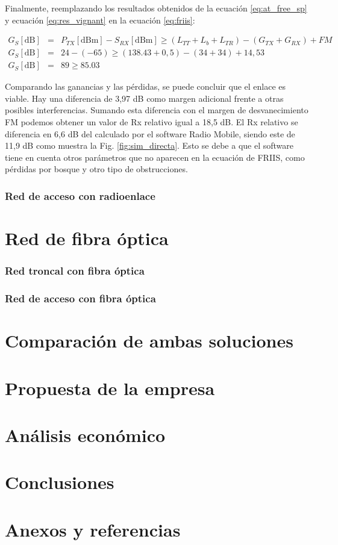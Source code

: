 \documentclass[11pt,a4paper]{article}
\begin{document}
Finalmente, reemplazando los resultados obtenidos de la ecuación \ref{eq:at_free_sp} y ecuación \ref{eq:res_vignant} en la ecuación \ref{eq:friis}: 

\begin{eqnarray*}
  G_S[\text{dB}]&=&P_{TX}[\text{dBm}]-S_{RX}[\text{dBm}] \geq (L_{TT}+L_b+L_{TR}) -(G_{TX}+G_{RX})+FM \\ 
G_S[\text{dB}]&=&24-(-65) \geq  (138.43+0,5)-(34+34)+14,53 \\ 
G_S[\text{dB}]&=&89 \geq 85.03 
\end{eqnarray*}

Comparando las ganancias y las pérdidas, se puede concluir que el enlace es viable. 
Hay una diferencia de 3,97 dB como margen adicional frente a otras posibles interferencias. 
Sumando esta diferencia con el margen de desvanecimiento FM podemos obtener un valor de Rx relativo igual a 18,5 dB. 
El Rx relativo se diferencia en 6,6 dB del calculado por el software Radio Mobile, siendo este de 11,9 dB como muestra la Fig. \ref{fig:sim_directa}. 
Esto se debe a que el software tiene en cuenta otros parámetros que no aparecen en la ecuación de FRIIS, como pérdidas por bosque y otro tipo de obstrucciones.

\section{Red de acceso con radioenlace}











\part{Red de fibra óptica}

\section{Red troncal con fibra óptica}

\section{Red de acceso con fibra óptica}



\part{Comparación de ambas soluciones}


\part{Propuesta de la empresa}

\part{Análisis económico}

\part{Conclusiones}

\part{Anexos y referencias}
\end{document}
